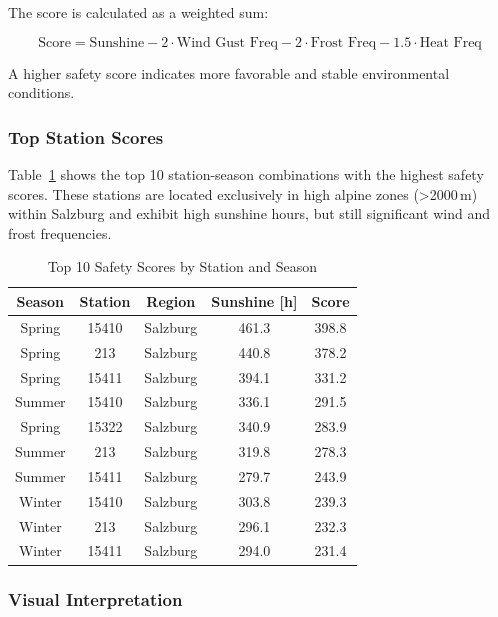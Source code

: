 \documentclass[sigconf]{acmart}
\begin{document}
The score is calculated as a weighted sum:

\begin{equation}
\text{Score} = \text{Sunshine} - 2 \cdot \text{Wind Gust Freq} - 2 \cdot \text{Frost Freq} - 1.5 \cdot \text{Heat Freq}
\end{equation}

A higher safety score indicates more favorable and stable environmental conditions.

\subsubsection{Top Station Scores}

Table~\ref{tab:top_scores} shows the top 10 station-season combinations with the highest safety scores. These stations are located exclusively in high alpine zones (\textgreater 2000\,m) within Salzburg and exhibit high sunshine hours, but still significant wind and frost frequencies.

\begin{table}[H]
\centering
\begin{tabular}{|c|c|c|c|c|}
\hline
\textbf{Season} & \textbf{Station} & \textbf{Region} & \textbf{Sunshine [h]} & \textbf{Score} \\
\hline
Spring & 15410 & Salzburg & 461.3 & 398.8 \\
Spring & 213   & Salzburg & 440.8 & 378.2 \\
Spring & 15411 & Salzburg & 394.1 & 331.2 \\
Summer & 15410 & Salzburg & 336.1 & 291.5 \\
Spring & 15322 & Salzburg & 340.9 & 283.9 \\
Summer & 213   & Salzburg & 319.8 & 278.3 \\
Summer & 15411 & Salzburg & 279.7 & 243.9 \\
Winter & 15410 & Salzburg & 303.8 & 239.3 \\
Winter & 213   & Salzburg & 296.1 & 232.3 \\
Winter & 15411 & Salzburg & 294.0 & 231.4 \\
\hline
\end{tabular}
\caption{Top 10 Safety Scores by Station and Season}
\label{tab:top_scores}
\end{table}

\subsubsection{Visual Interpretation}
\end{document}
